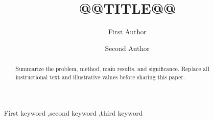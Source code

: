 \documentclass[preprint,12pt]{elsarticle}
\begin{document}
\begin{frontmatter}
\title{@@TITLE@@}
\author[inst]{First Author}
\author[inst]{Second Author}
\address[inst]{Department, Institution, City, Country}
\begin{abstract}
Summarize the problem, method, main results, and significance. Replace all
instructional text and illustrative values before sharing this paper.
\end{abstract}
\begin{keyword}
First keyword \sep second keyword \sep third keyword
\end{keyword}
\end{frontmatter}




\end{document}
